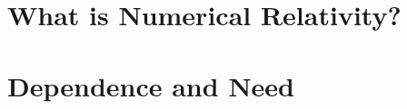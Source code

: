 \section{What is Numerical Relativity?}\label{sec:what-is-numerical-relativity?}
\section{Dependence and Need}\label{sec:dependence-and-need}

